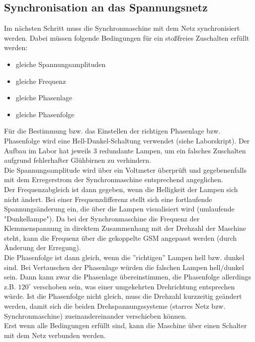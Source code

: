 \subsection{Synchronisation an das Spannungsnetz}
Im nächsten Schritt muss die Synchronmaschine mit dem Netz synchronisiert werden. Dabei müssen folgende Bedingungen für ein stoßfreies Zuschalten erfüllt werden:
\begin{itemize}
    \item gleiche Spannungsamplituden
    \item gleiche Frequenz
    \item gleiche Phasenlage
    \item gleiche Phasenfolge
\end{itemize}
Für die Bestimmung bzw. das Einstellen der richtigen Phasenlage bzw. Phasenfolge wird eine Hell-Dunkel-Schaltung verwendet (siehe Laborskript). Der Aufbau im Labor hat jeweils 3 redundante Lampen, um ein falsches Zuschalten aufgrund fehlerhafter Glühbirnen zu verhindern.\\
Die Spannungsamplitude wird über ein Voltmeter überprüft und gegebenenfalls mit dem Erregerstrom der Synchronmaschine entsprechend angeglichen.\\
Der Frequenzabgleich ist dann gegeben, wenn die Helligkeit der Lampen sich nicht ändert. Bei einer Frequenzdifferenz  stellt sich eine fortlaufende Spannungsänderung ein, die über die Lampen visualisiert wird (umlaufende "Dunkellampe"). Da bei der Synchronmaschine die Frequenz der Klemmenspannung in direktem Zusammenhang mit der Drehzahl der Maschine steht, kann die Frequenz über die gekoppelte GSM angepasst werden (durch Änderung der Erregung).\\
Die Phasenfolge ist dann gleich, wenn die ''richtigen'' Lampen hell bzw. dunkel sind. Bei Vertauschen der Phasenlage würden die falschen Lampen hell/dunkel sein. Dann kann zwar die Phasenlage übereinstimmen, die Phasenfolge allerdings z.B. $120^{\circ}$ verschoben sein, was einer umgekehrten Drehrichtung entsprechen würde. Ist die Phasenfolge nicht gleich, muss die Drehzahl kurzzeitig geändert werden, damit sich die beiden Drehspannungssysteme (starres Netz bzw. Synchronmaschine) zueinandereinander verschieben können.\\
Erst wenn alle Bedingungen erfüllt sind, kann die Maschine über einen Schalter mit dem Netz verbunden werden.
